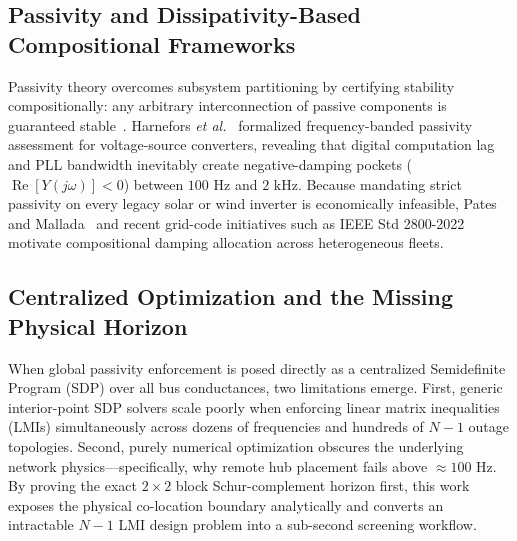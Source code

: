 \documentclass[10pt,twocolumn]{article}
\begin{document}
\subsection{Passivity and Dissipativity-Based Compositional Frameworks}
Passivity theory overcomes subsystem partitioning by certifying stability compositionally: any arbitrary interconnection of passive components is guaranteed stable~\cite{harnefors2016passivity}. Harnefors \textit{et al.}~\cite{harnefors2016passivity} formalized frequency-banded passivity assessment for voltage-source converters, revealing that digital computation lag and PLL bandwidth inevitably create negative-damping pockets ($\operatorname{Re}[Y(j\omega)] < 0$) between $100\text{ Hz}$ and $2\text{ kHz}$. Because mandating strict passivity on every legacy solar or wind inverter is economically infeasible, Pates and Mallada~\cite{pates2019robust} and recent grid-code initiatives such as IEEE Std 2800-2022~\cite{ieee2800} motivate compositional damping allocation across heterogeneous fleets.

\subsection{Centralized Optimization and the Missing Physical Horizon}
When global passivity enforcement is posed directly as a centralized Semidefinite Program (SDP) over all bus conductances, two limitations emerge. First, generic interior-point SDP solvers scale poorly when enforcing linear matrix inequalities (LMIs) simultaneously across dozens of frequencies and hundreds of $N-1$ outage topologies. Second, purely numerical optimization obscures the underlying network physics---specifically, why remote hub placement fails above $\approx 100\text{ Hz}$. By proving the exact $2\times 2$ block Schur-complement horizon first, this work exposes the physical co-location boundary analytically and converts an intractable $N-1$ LMI design problem into a sub-second screening workflow.
\end{document}
